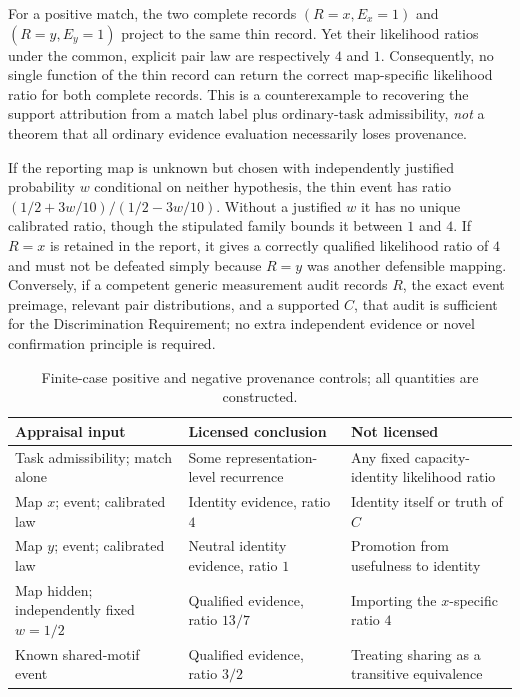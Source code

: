 \documentclass[11pt]{article}
\begin{document}
For a positive match, the two complete records \((R=x,E_x=1)\) and \((R=y,E_y=1)\) project to the same thin record. Yet their likelihood ratios under the common, explicit pair law are respectively \(4\) and \(1\). Consequently, no single function of the thin record can return the correct map-specific likelihood ratio for both complete records. This is a counterexample to recovering the support attribution from a match label plus ordinary-task admissibility, \emph{not} a theorem that all ordinary evidence evaluation necessarily loses provenance.

If the reporting map is unknown but chosen with independently justified probability \(w\) conditional on neither hypothesis, the thin event has ratio \((1/2+3w/10)/(1/2-3w/10)\). Without a justified \(w\) it has no unique calibrated ratio, though the stipulated family bounds it between \(1\) and \(4\). If \(R=x\) is retained in the report, it gives a correctly qualified likelihood ratio of \(4\) and must not be defeated simply because \(R=y\) was another defensible mapping. Conversely, if a competent generic measurement audit records \(R\), the exact event preimage, relevant pair distributions, and a supported \(C\), that audit is sufficient for the Discrimination Requirement; no extra independent evidence or novel confirmation principle is required.


\begin{table}[ht]
\centering
\small
\begin{tabularx}{\textwidth}{>{\raggedright\arraybackslash}p{} X X}
\toprule
Appraisal input & Licensed conclusion & Not licensed\\
\midrule
Task admissibility; match alone & Some representation-level recurrence & Any fixed capacity-identity likelihood ratio\\
Map \(x\); event; calibrated law & Identity evidence, ratio \(4\) & Identity itself or truth of \(C\)\\
Map \(y\); event; calibrated law & Neutral identity evidence, ratio \(1\) & Promotion from usefulness to identity\\
Map hidden; independently fixed \(w=1/2\) & Qualified evidence, ratio \(13/7\) & Importing the \(x\)-specific ratio \(4\)\\
Known shared-motif event & Qualified evidence, ratio \(3/2\) & Treating sharing as a transitive equivalence\\
\bottomrule
\end{tabularx}
\caption{Finite-case positive and negative provenance controls; all quantities are constructed.}
\label{tab:provenance-controls}
\end{table}
\end{document}

